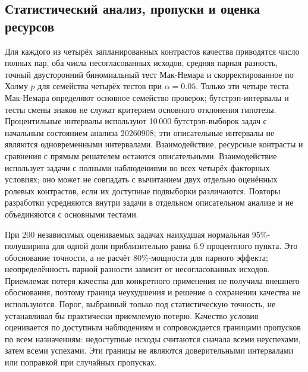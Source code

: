 \subsection{Статистический анализ, пропуски и оценка ресурсов}
Для каждого из четырёх запланированных контрастов качества приводятся число полных пар, оба числа несогласованных исходов, средняя парная разность, точный двусторонний биномиальный тест Мак-Немара и скорректированное по Холму $p$ для семейства четырёх тестов при $\alpha=0.05$. Только эти четыре теста Мак-Немара определяют основное семейство проверок; бутстрэп-интервалы и тесты смены знаков не служат критерием основного отклонения гипотезы. Процентильные интервалы используют 10\,000 бутстрэп-выборок задач с начальным состоянием анализа 20260908; эти описательные интервалы не являются одновременными интервалами. Взаимодействие, ресурсные контрасты и сравнения с прямым решателем остаются описательными. Взаимодействие использует задачи с полными наблюдениями во всех четырёх факторных условиях; оно может не совпадать с вычитанием двух отдельно оценённых ролевых контрастов, если их доступные подвыборки различаются. Повторы разработки усредняются внутри задачи в отдельном описательном анализе и не объединяются с основными тестами.

При 200 независимых оцениваемых задачах наихудшая нормальная 95\%-полуширина для одной доли приблизительно равна 6.9 процентного пункта. Это обоснование точности, а не расчёт 80\%-мощности для парного эффекта; неопределённость парной разности зависит от несогласованных исходов. Приемлемая потеря качества для конкретного применения не получила внешнего обоснования, поэтому граница неухудшения и решение о сохранении качества не используются. Порог, выбранный только под статистическую точность, не устанавливал бы практически приемлемую потерю. Качество условия оценивается по доступным наблюдениям и сопровождается границами пропусков по всем назначениям: недоступные исходы считаются сначала всеми неуспехами, затем всеми успехами. Эти границы не являются доверительными интервалами или поправкой при случайных пропусках.

